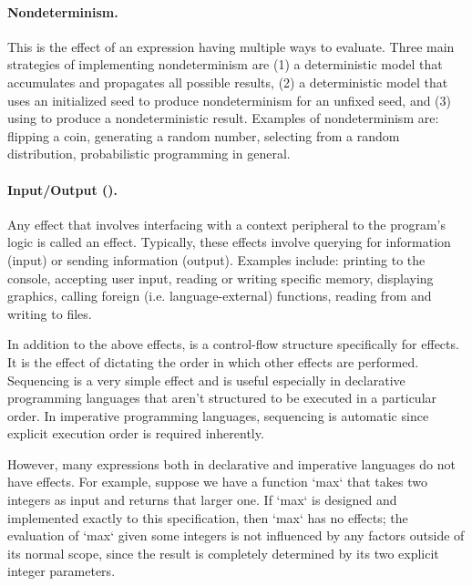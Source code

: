 \paragraph{Nondeterminism.}
This is the effect of an expression having multiple ways to evaluate.
Three main strategies of implementing nondeterminism are
(1) a deterministic model that accumulates and propagates all possible results,
(2) a deterministic model that uses an initialized seed to produce nondeterminism for an unfixed seed, and
(3) using \IO to produce a nondeterministic result.
Examples of nondeterminism are: flipping a coin, generating a random number, selecting from a random distribution, probabilistic programming in general.

\paragraph{Input/Output (\IO).}
Any effect that involves interfacing with a context peripheral to the program's logic is called an \IO effect.
Typically, these effects involve querying for information (input) or sending information (output).
Examples include: printing to the console, accepting user input, reading or writing specific memory, displaying graphics, calling foreign (i.e. language-external) functions, reading from and writing to files.

\newparagraph
In addition to the above effects,  is a control-flow structure specifically for effects.
It is the effect of dictating the order in which other effects are performed.
Sequencing is a very simple effect and is useful especially in declarative programming languages that aren't structured to be executed in a particular order.
In imperative programming languages, sequencing is automatic since explicit execution order is required inherently.

However, many expressions both in declarative and imperative languages do not have effects.
For example, suppose we have a function \code`max` that takes two integers as input and returns that larger one.
If \code`max` is designed and implemented exactly to this specification, then \code`max` has no effects; the evaluation of \code`max` given some integers is not influenced by any factors outside of its normal scope, since the result is completely determined by its two explicit integer parameters.

